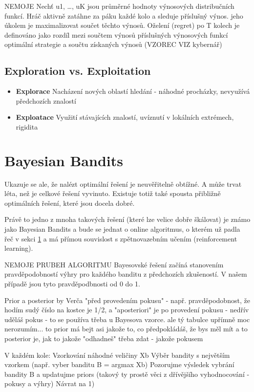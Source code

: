 \documentclass[thesis=M,czech]{FITthesis}[2014/05/07]
\begin{document}
NEMOJE
Nechť u1, …, uK jsou průměrné hodnoty výnosových distribučních funkcí. Hráč aktivně zatáhne za páku každé kolo a sleduje příslušný výnos. jeho úkolem je maximalizovat součet těchto výnosů. Oželení (regret) po T kolech je definováno jako rozdíl mezi součtem výnosů příslušných výnosových funkcí optimální strategie a součtu získaných výnosů (VZOREC VIZ kybernář)

\subsection{Exploration vs. Exploitation}

\begin{itemize}
  \item \textbf{Explorace} Nacházení nových oblastí hledání - náhodné procházky, nevyužívá předchozích znalostí
  \item \textbf{Exploatace} Využití stávajících znalostí, uvíznutí v lokálních extrémech, rigidita
\end{itemize}	

\section{Bayesian Bandits}

Ukazuje se ale, že nalézt optimální řešení je neuvěřitelně obtížné. A může trvat léta, než je celkové řešení vyvinuto. Existuje totiž také spousta přibližně optimálních řešení, které jsou docela dobré. 

Právě to jedno z mnoha takových řešení (které lze velice dobře škálovat) je známo jako Bayesian Bandits a bude se jednat o online algoritmus, o kterém už padla řeč v sekci \ref{} a má přímou souvislost s zpětnovazebním učením (reinforcement learning).

NEMOJE PRUBEH ALGORITMU
Bayesovské řešení začíná stanovením pravděpodobností výhry pro každého banditu z předchozích zkušeností. V našem případě jsou tyto pravděpodbnosti od 0 do 1. 

Prior a posterior by Verča
"před provedením pokusu" - např. pravděpodobnost, že hodím sudý číslo na kostce je 1/2, a "aposteriori" je po provedení pokusu - nedřív uděláš pokus - to se používa třeba u Bayesova vzorce. ale tý tabulce upřímně moc nerozumím... to prior má bejt asi jakože to, co předpokládáš, že bys měl mít a to posterior je, jak to jakože "odhadneš" třeba  zdat - jakože pokusem

V každém kole:
Vzorkování náhodné veličiny Xb 
Výběr bandity s největším vzorkem (např. vyber banditu B = argmax Xb)
Pozorujme výsledek vybrání bandity B a updatujme priors (takový ty prostě věci z dřívějšího vyhodnocování - pokusy a výhry)
Návrat na 1)
\end{document}
